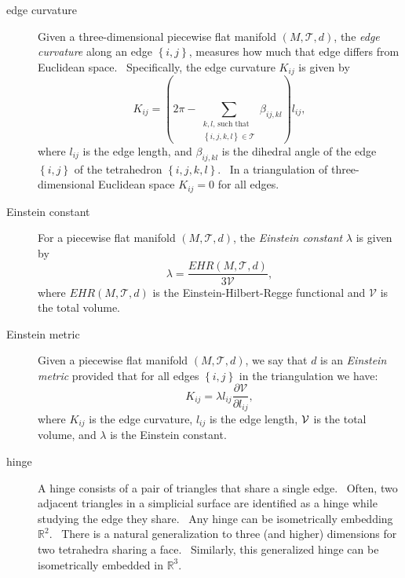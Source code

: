 \begin{description}
\item[edge curvature] Given a three-dimensional piecewise flat manifold $%
\left( M,\mathcal{T},d\right) $, the \textit{edge curvature} along an edge $%
\left\{ i,j\right\} $, measures how much that edge differs from Euclidean
space. \ Specifically, the edge curvature $K_{ij}$ is given by 
\begin{equation*}
K_{ij}=\left( 2\pi -\sum\limits_{\substack{ k,l\text{, such that}  \\ %
\left\{ i,j,k,l\right\} \in \mathcal{T}}}\beta _{ij,kl}\right) l_{ij},
\end{equation*}%
where $l_{ij}$ is the edge length, and $\beta _{ij,kl}$ is the dihedral
angle of the edge $\left\{ i,j\right\} $ of the tetrahedron $\left\{
i,j,k,l\right\} $. \ In a triangulation of three-dimensional Euclidean space 
$K_{ij}=0$ for all edges. \ 

\item[Einstein constant] For a piecewise flat manifold $\left( M,\mathcal{T}%
,d\right) $, the \textit{Einstein constant} $\lambda $ is given by%
\begin{equation*}
\lambda =\frac{EHR\left( M,\mathcal{T},d\right) }{3\mathcal{V}},
\end{equation*}%
where $EHR\left( M,\mathcal{T},d\right) $ is the Einstein-Hilbert-Regge
functional and $\mathcal{V}$ is the total volume.

\item[Einstein metric] Given a piecewise flat manifold $\left( M,\mathcal{T}%
,d\right) $, we say that $d$ is an \textit{Einstein metric} provided that
for all edges $\left\{ i,j\right\} $ in the triangulation we have:%
\begin{equation*}
K_{ij}=\lambda l_{ij}\frac{\partial \mathcal{V}}{\partial l_{ij}},
\end{equation*}%
where $K_{ij}$ is the edge curvature, $l_{ij}$ is the edge length, $\mathcal{%
V}$ is the total volume, and $\lambda $ is the Einstein constant.

\item[hinge] A hinge consists of a pair of triangles that share a single
edge. \ Often, two adjacent triangles in a simplicial surface are identified
as a hinge while studying the edge they share. \ Any hinge can be
isometrically embedding $%
\mathbb{R}
^{2}$. \ There is a natural generalization to three (and higher) dimensions
for two tetrahedra sharing a face. \ Similarly, this generalized hinge can
be isometrically embedded in $%
\mathbb{R}
^{3}$. \ 


\end{description}

